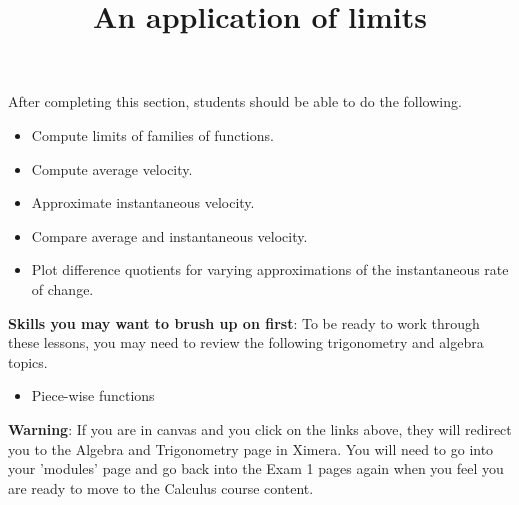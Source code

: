 \documentclass{ximera}
\title{An application of limits}
\begin{document}
\begin{abstract}
\end{abstract}

\maketitle

\begin{sectionOutcomes}

After completing this section, students should be able to do the following.

\begin{itemize}
\item Compute limits of families of functions. 
\item Compute average velocity.
\item Approximate instantaneous velocity.
\item Compare average and instantaneous velocity.
\item Plot difference quotients for varying approximations of the
  instantaneous rate of change.
\end{itemize}

\end{sectionOutcomes}

\bigskip

\textbf{Skills you may want to brush up on first}: To be ready to work
through these lessons, you may need to review the following trigonometry and algebra topics.
\begin{itemize}
    \item Piece-wise functions
\end{itemize}

\bigskip

\textbf{Warning}: If you are in canvas and you click on the links above, they will redirect you
to the Algebra and Trigonometry page in Ximera. You will need to
go into your 'modules' page and go back into the Exam 1 pages again
when you feel you are ready to move to the Calculus course content.
\end{document}
